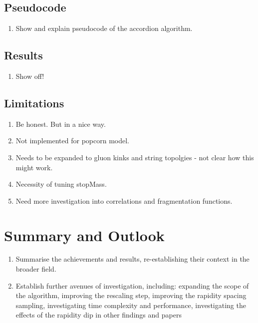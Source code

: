 \documentclass[12pt,a4paper]{report}
\begin{document}
\section{Pseudocode}
\begin{enumerate}
\item Show and explain pseudocode of the accordion algorithm.
\end{enumerate}

\section{Results}
\begin{enumerate}
\item Show off!
\end{enumerate}

\section{Limitations}
\begin{enumerate}
\item Be honest. But in a nice way.
\item Not implemented for popcorn model.
\item Needs to be expanded to gluon kinks and string topolgies - not clear how this might work.
\item Necessity of tuning stopMass.
\item Need more investigation into correlations and fragmentation functions.
\end{enumerate}

\chapter{Summary and Outlook}
\begin{enumerate}
\item Summarise the achievements and results, re-establishing their context in the broader field.
\item Establish further avenues of investigation, including: expanding the scope of the algorithm, improving the rescaling step, improving the rapidity spacing sampling, investigating time complexity and performance, investigating the effects of the rapidity dip in other findings and papers
\end{enumerate}



\end{document}
